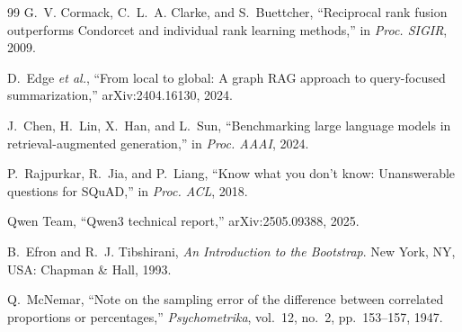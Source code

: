 \documentclass[conference]{IEEEtran}
\begin{document}
\begin{thebibliography}{99}
G.~V. Cormack, C.~L.~A. Clarke, and S.~Buettcher, ``Reciprocal rank fusion outperforms Condorcet and individual rank learning methods,'' in \emph{Proc. SIGIR}, 2009.

D.~Edge \emph{et al.}, ``From local to global: A graph RAG approach to query-focused summarization,'' arXiv:2404.16130, 2024.

J.~Chen, H.~Lin, X.~Han, and L.~Sun, ``Benchmarking large language models in retrieval-augmented generation,'' in \emph{Proc. AAAI}, 2024.

P.~Rajpurkar, R.~Jia, and P.~Liang, ``Know what you don't know: Unanswerable questions for SQuAD,'' in \emph{Proc. ACL}, 2018.

Qwen Team, ``Qwen3 technical report,'' arXiv:2505.09388, 2025.

B.~Efron and R.~J. Tibshirani, \emph{An Introduction to the Bootstrap}. New York, NY, USA: Chapman \& Hall, 1993.

Q.~McNemar, ``Note on the sampling error of the difference between correlated proportions or percentages,'' \emph{Psychometrika}, vol.~12, no.~2, pp.~153--157, 1947.

\end{thebibliography}
\end{document}

